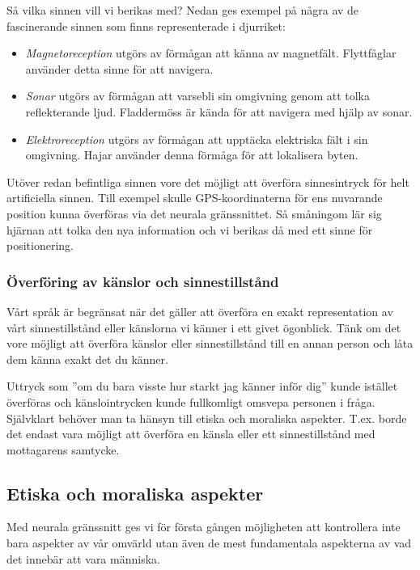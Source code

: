 \documentclass[12pt, a4paper]{article}
\begin{document}
Så vilka sinnen vill vi berikas med? Nedan ges exempel på några av de
fascinerande sinnen som finns representerade i djurriket:

\begin{itemize}
	\item \textit{Magnetoreception} utgörs av förmågan att känna av magnetfält.
	Flyttfåglar använder detta sinne för att navigera.
	\item \textit{Sonar} utgörs av förmågan att varsebli sin omgivning genom att
	tolka reflekterande ljud. Fladdermöss är kända för att navigera med hjälp av
	sonar.
	\item \textit{Elektroreception} utgörs av förmågan att upptäcka elektriska
	fält i sin omgivning. Hajar använder denna förmåga för att lokalisera byten.
\end{itemize}

Utöver redan befintliga sinnen vore det möjligt att överföra sinnesintryck för
helt artificiella sinnen. Till exempel skulle GPS-koordinaterna för ens
nuvarande position kunna överföras via det neurala gränssnittet. Så småningom
lär sig hjärnan att tolka den nya information och vi berikas då med ett sinne
för positionering.

\subsubsection{Överföring av känslor och sinnestillstånd}

Vårt språk är begränsat när det gäller att överföra en exakt representation av
vårt sinnestillstånd eller känslorna vi känner i ett givet ögonblick. Tänk om
det vore möjligt att överföra känslor eller sinnestillstånd till en annan person
och låta dem känna exakt det du känner.

Uttryck som ''om du bara visste hur starkt jag känner inför dig'' kunde istället
överföras och känslointrycken kunde fullkomligt omsvepa personen i fråga.
Självklart behöver man ta hänsyn till etiska och moraliska aspekter. T.ex. borde
det endast vara möjligt att överföra en känsla eller ett sinnestillstånd med
mottagarens samtycke.


\subsection{Etiska och moraliska aspekter}

Med neurala gränssnitt ges vi för första gången möjligheten att kontrollera inte
bara aspekter av vår omvärld utan även de mest fundamentala aspekterna av vad
det innebär att vara människa.
\end{document}
